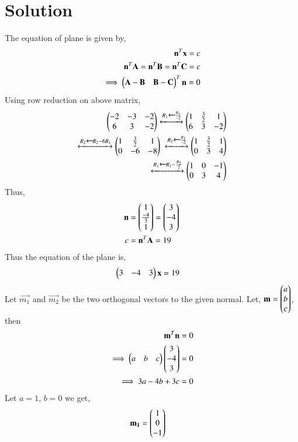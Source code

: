 \documentclass[journal,12pt,twocolumn]{IEEEtran}
\begin{document}
\section{Solution}
The equation of plane is given by, 
\begin{align}
\mathbf{n}^T\mathbf{x} = c \\
\mathbf{n}^T\mathbf{A}=\mathbf{n}^T\mathbf{B}=\mathbf{n}^T\mathbf{C}=c \\
\implies \begin{pmatrix}\mathbf{A}-\mathbf{B} & \mathbf{B}-\mathbf{C}\end{pmatrix}^T\mathbf{n}=0
\end{align}
Using row reduction on above matrix, 
\begin{align}
    \begin{pmatrix}-2&-3&-2\\6&3&-2\end{pmatrix} \xleftrightarrow{R_1\xleftarrow{}\frac{R_1}{-2}}
    \begin{pmatrix}1&\frac{3}{2}&1\\6&3&-2\end{pmatrix} \\
    \xleftrightarrow{R_2\xleftarrow{}R_2-6R_1} \begin{pmatrix}1&\frac{3}{2}&1\\0&-6&-8\end{pmatrix}\
    \xleftrightarrow{R_2\xleftarrow{}\frac{R_2}{-2}}\begin{pmatrix}1&\frac{3}{2}&1\\0&3&4\end{pmatrix}\\
    \xleftrightarrow{R_1\xleftarrow{}R_1-\frac{R_2}{2}} \begin{pmatrix}1&0&-1\\0&3&4\end{pmatrix}
\end{align}
Thus, 
\begin{align}
    \mathbf{n}&=\begin{pmatrix}1\\ \frac{-4}{3}\\1\end{pmatrix} = \begin{pmatrix}3\\-4\\3\end{pmatrix} \\
    c&=\mathbf{n}^T\mathbf{A}=19
\end{align}
Thus the equation of the plane is, 
\begin{align}
    \begin{pmatrix}3&-4&3\end{pmatrix}\mathbf{x}&=19
\end{align}
Let $\vec{m_1}$ and $\vec{m_2}$ be the two orthogonal vectors to the given normal.
Let, $\mathbf{m}=\begin{pmatrix}a\\b\\c\end{pmatrix}$, then
\begin{align}
    \mathbf{m}^T\mathbf{n}&=0 \\
    \implies\begin{pmatrix}a&b&c\end{pmatrix}\begin{pmatrix}3\\-4\\3\end{pmatrix}&=0 \\
    \implies 3a-4b+3c&=0
\end{align}
Let $a=1$, $b=0$ we get,
\begin{align}
    \mathbf{m_1}&=\begin{pmatrix}1\\0\\-1\end{pmatrix}
\end{align}
\end{document}
